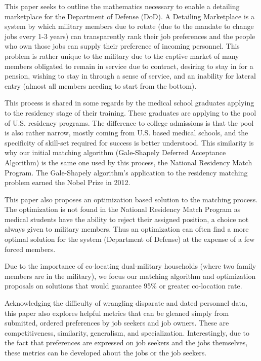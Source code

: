 This paper seeks to outline the mathematics necessary to enable a detailing marketplace for the Department of Defense (DoD). A Detailing Marketplace is a system by which military members due to rotate (due to the mandate to change jobs every 1-3 years) can transparently rank their job preferences and the people who own those jobs can supply their preference of incoming personnel. This problem is rather unique to the military due to the captive market of many members obligated to remain in service due to contract, desiring to stay in for a pension, wishing to stay in through a sense of service, and an inability for lateral entry (almost all members needing to start from the bottom). 

This process is shared in some regards by the medical school graduates applying to the residency stage of their training. These graduates are applying to the pool of U.S. residency programs. The difference to college admissions is that the pool is also rather narrow, mostly coming from U.S. based medical schools, and the specificity of skill-set required for success is better understood. This similarity is why our initial matching algorithm (Gale-Shapely Deferred Acceptance Algorithm) is the same one used by this process, the National Residency Match Program. The Gale-Shapely algorithm's application to the residency matching problem earned the Nobel Prize in 2012.

This paper also proposes an optimization based solution to the matching process. The optimization is not found in the National Residency Match Program as medical students have the ability to reject their assigned position, a choice not always given to military members. Thus an optimization can often find a more optimal solution for the system (Department of Defense) at the expense of a few forced members.

Due to the importance of co-locating dual-military households (where two family members are in the military), we focus our matching algorithm and optimization proposals on solutions that would guarantee 95\% or greater co-location rate.

Acknowledging the difficulty of wrangling disparate and dated personnel data, this paper also explores helpful metrics that can be gleaned simply from submitted, ordered preferences by job seekers and job owners. These are competitiveness, similarity, generalism, and specialization. Interestingly, due to the fact that preferences are expressed on job seekers and the jobs themselves, these metrics can be developed about the jobs or the job seekers.

